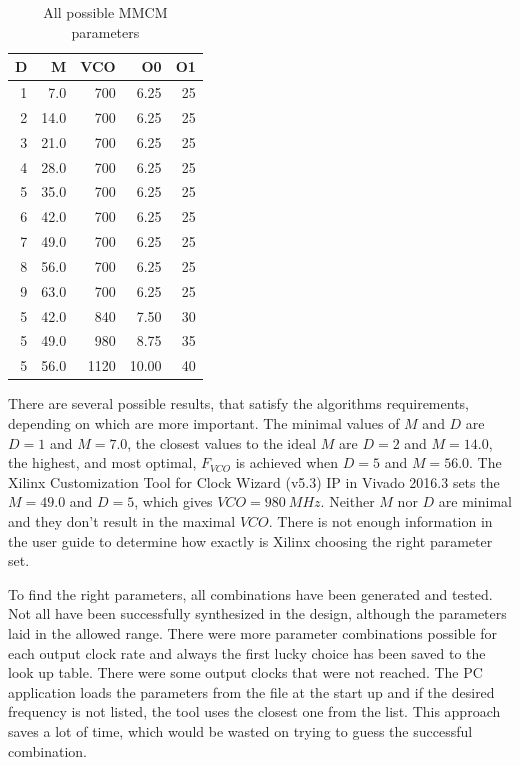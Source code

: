 \begin{table}[h]
\begin{tabular}{@{}rrrrr@{}}
\toprule
D & M & VCO & O0 & O1 \\
\midrule
1 & 7.0 & 700 & 6.25 & 25 \\ 
2 & 14.0 & 700 & 6.25 & 25 \\ 
3 & 21.0 & 700 & 6.25 & 25 \\ 
4 & 28.0 & 700 & 6.25 & 25 \\ 
5 & 35.0 & 700 & 6.25 & 25 \\  
6 & 42.0 & 700 & 6.25 & 25 \\ 
7 & 49.0 & 700 & 6.25 & 25 \\ 
8 & 56.0 & 700 & 6.25 & 25 \\ 
9 & 63.0 & 700 & 6.25 & 25 \\ 
5 & 42.0 & 840 & 7.50 & 30 \\ 
5 & 49.0 & 980 & 8.75 & 35 \\ 
5 & 56.0 & 1120 & 10.00 & 40 \\ 
\bottomrule
\end{tabular}
\centering
\caption{All possible MMCM parameters} \label{tab:MMCM}
\end{table}

There are several possible results, that satisfy the algorithms requirements, depending on which are more important. The minimal values of $M$ and $D$ are $D=1$ and $M=7.0$, the closest values to the ideal $M$ are $D=2$ and $M=14.0$, the highest, and most optimal, $F_{VCO}$ is achieved when $D=5$ and $M=56.0$. The Xilinx Customization Tool for Clock Wizard (v5.3) IP in Vivado 2016.3 sets the $M = 49.0$ and $D=5$, which gives $VCO = 980\ MHz$. Neither $M$ nor $D$ are minimal and they don't result in the maximal $VCO$. There is not enough information in the user guide to determine how exactly is Xilinx choosing the right parameter set.

To find the right parameters, all combinations have been generated and tested. Not all have been successfully synthesized in the design, although the parameters laid in the allowed range. There were more parameter combinations possible for each output clock rate and always the first lucky choice has been saved to the look up table. There were some output clocks that were not reached. The PC application loads the parameters from the file at the start up and if the desired frequency is not listed, the tool uses the closest one from the list. This approach saves a lot of time, which would be wasted on trying to guess the successful combination.
